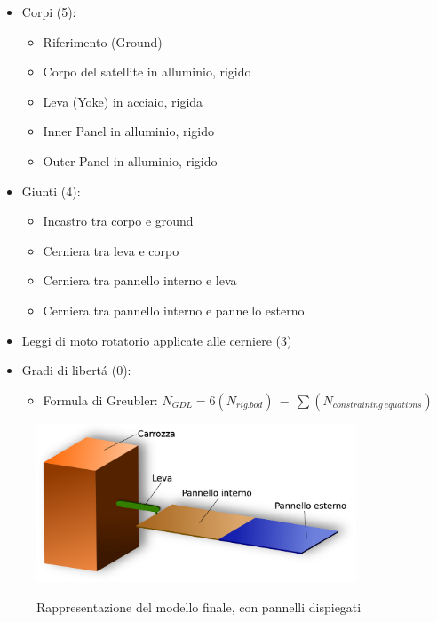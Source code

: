\documentclass{article}
\begin{document}
        \begin{itemize}
            \item Corpi (5):
            \begin{itemize}
                \item Riferimento (Ground) 
                \item Corpo del satellite in alluminio, rigido
                \item Leva (Yoke) in acciaio, rigida
                \item Inner Panel in alluminio, rigido
                \item Outer Panel in alluminio, rigido
            \end{itemize}
            \item Giunti (4):
            \begin{itemize}
                \item Incastro tra corpo e ground
                \item Cerniera tra leva e corpo
                \item Cerniera tra pannello interno e leva
                \item Cerniera tra pannello interno e pannello esterno
            \end{itemize}
            \item Leggi di moto rotatorio applicate alle cerniere (3)
            \item Gradi di libertá (0):
            \begin{itemize}
                \item Formula di Greubler: $N_{GDL} = 6(N_{rig.bod}) \ - \  \sum (N_{constraining \ equations}) $
            \end{itemize}
        \end{itemize}


        \begin{figure}[h!]
            \centering 
             \label{satellite_dispiegato}
            \includegraphics[width=0.85\textwidth]{MUL2/Esercitazione4/satellite_dispiegato.eps}
            \caption{Rappresentazione del modello finale, con pannelli dispiegati}
        \end{figure}
\end{document}
